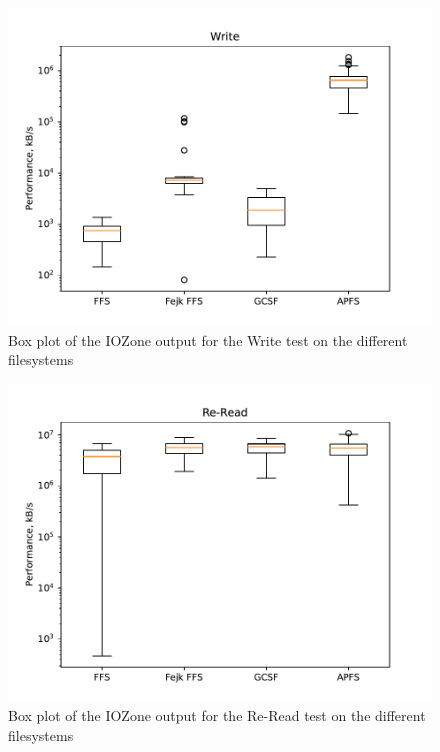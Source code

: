 \begin{figure}[!htb]
	\label{fig:res_box_write}
	\begin{center}
		\includegraphics[width=1.0\textwidth]{figures/benchmarking/Write_box.pdf}
	\end{center}
	\caption{Box plot of the IOZone output for the Write test on the different filesystems}
\end{figure}

\begin{figure}[!htb]
	\label{fig:res_box_reread}
	\begin{center}
		\includegraphics[width=1.0\textwidth]{figures/benchmarking/Re-Read_box.pdf}
	\end{center}
	\caption{Box plot of the IOZone output for the Re-Read test on the different filesystems}
\end{figure}

